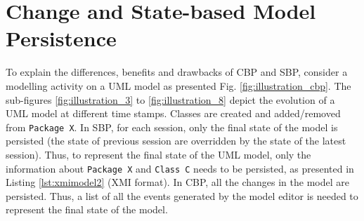 \vspace{-20pt}
\section{Change and State-based Model Persistence}
\label{sec:change_and_state_based_model_persistence}

\vspace{-10pt}
To explain the differences, benefits and drawbacks of CBP and SBP, consider a modelling activity on a UML model as presented Fig. \ref{fig:illustration_cbp}. The sub-figures \ref{fig:illustration_3} to \ref{fig:illustration_8} depict the evolution of a UML model at different time stamps. Classes are created and added/removed from \texttt{Package X}. In SBP, for each session, only the final state of the model is persisted (the state of previous session are overridden by the state of the latest session). Thus, to represent the final state of the UML model, only the information about \texttt{Package X} and \texttt{Class C} needs to be persisted, as presented in Listing \ref{lst:xmimodel2} (XMI format). In CBP, all the changes in the model are persisted. Thus, a list of all the events generated by the model editor is needed to represent the final state of the model.


